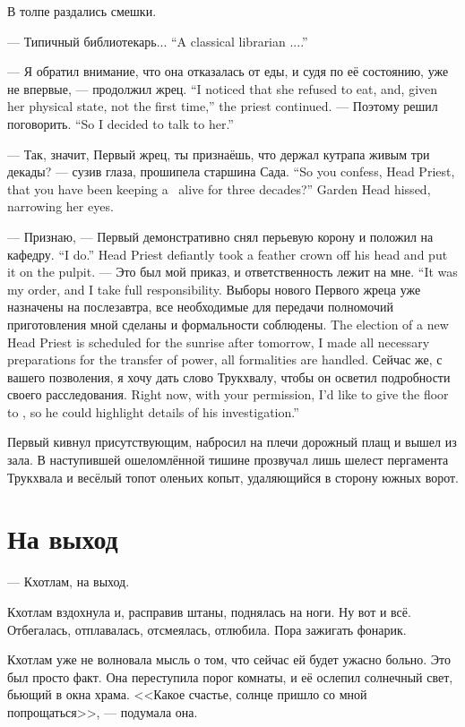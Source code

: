 В толпе раздались смешки.

{--- Типичный библиотекарь...}
{``A classical librarian ....''}

{--- Я обратил внимание, что она отказалась от еды, и судя по её состоянию, уже не впервые, --- продолжил жрец.}
{``I noticed that she refused to eat, and, given her physical state, not the first time,'' the priest continued.}
{--- Поэтому решил поговорить.}
{``So I decided to talk to her.''}

{--- Так, значит, Первый жрец, ты признаёшь, что держал кутрапа живым три декады? --- сузив глаза, прошипела старшина Сада.}
{``So you confess, Head Priest, that you have been keeping a \kutraph\ alive for three decades?'' Garden Head hissed, narrowing her eyes.}

{--- Признаю, --- Первый демонстративно снял перьевую корону и положил на кафедру.}
{``I do.'' Head Priest defiantly took a feather crown off his head and put it on the pulpit.}
{--- Это был мой приказ, и ответственность лежит на мне.}
{``It was my order, and I take full responsibility.}
{Выборы нового Первого жреца уже назначены на послезавтра, все необходимые для передачи полномочий приготовления мной сделаны и формальности соблюдены.}
{The election of a new Head Priest is scheduled for the sunrise after tomorrow, I made all necessary preparations for the transfer of power, all formalities are handled.}
{Сейчас же, с вашего позволения, я хочу дать слово Трукхвалу, чтобы он осветил подробности своего расследования.}
{Right now, with your permission, I'd like to give the floor to \Trukchual, so he could highlight details of his investigation.''}

Первый кивнул присутствующим, набросил на плечи дорожный плащ и вышел из зала.
В наступившей ошеломлённой тишине прозвучал лишь шелест пергамента Трукхвала и весёлый топот оленьих копыт, удаляющийся в сторону южных ворот.

\section{На выход}

--- Кхотлам, на выход.

Кхотлам вздохнула и, расправив штаны, поднялась на ноги.
Ну вот и всё.
Отбегалась, отплавалась, отсмеялась, отлюбила.
Пора зажигать фонарик.

Кхотлам уже не волновала мысль о том, что сейчас ей будет ужасно больно.
Это был просто факт.
Она переступила порог комнаты, и её ослепил солнечный свет, бьющий в окна храма.
<<Какое счастье, солнце пришло со мной попрощаться>>, --- подумала она.

